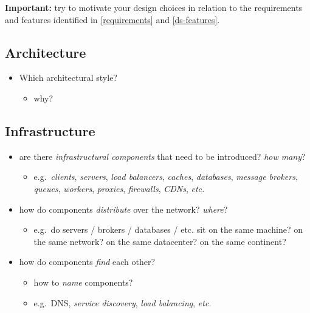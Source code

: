 \documentclass{scrartcl}
\begin{document}
\noindent
\textbf{Important:} try to motivate your design choices in relation to the requirements and features identified 
in \cref{requirements} and \cref{ds-features}.

\subsection{Architecture}\label{architecture}

\begin{itemize}
  \item Which architectural style?
  \begin{itemize}
    \item why?
  \end{itemize}
\end{itemize}

\subsection{Infrastructure}\label{infrastructure}

\begin{itemize}
  \item are there \emph{infrastructural components} that need to be introduced? \emph{how many}?
  \begin{itemize}
    \item e.g.~\emph{clients}, \emph{servers}, \emph{load balancers},
    \emph{caches}, \emph{databases}, \emph{message brokers},
    \emph{queues}, \emph{workers}, \emph{proxies}, \emph{firewalls},
    \emph{CDNs}, \emph{etc.}
  \end{itemize}

  \item how do components \emph{distribute} over the network? \emph{where}?
  \begin{itemize}
    \item e.g.~do servers / brokers / databases / etc. sit on the same
    machine? on the same network? on the same datacenter? on the same
    continent?
  \end{itemize}

  \item how do components \emph{find} each other?
  \begin{itemize}
    \item how to \emph{name} components?
    \item e.g.~DNS, \emph{service discovery}, \emph{load balancing},
    \emph{etc.}
  \end{itemize}
\end{itemize}
\end{document}

